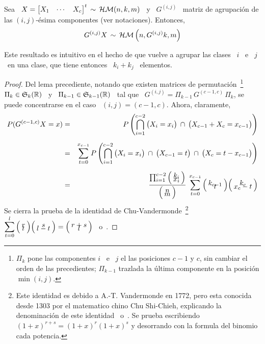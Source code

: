 %
\begin{lema}\label{Lem:MP:StabAgregacionHipergeomMulti}
%
  Sea  \ $X =  \begin{bmatrix} X_1  & \cdots  & X_c  \end{bmatrix}^t \,  \sim \,
  \mathcal{H}\mathcal{M}(n,k,m)$ \ y \ $G^{(i,j)}$ \ matriz de agrupaci\'on de las $(i,j)$-\'esima
  componentes (ver notaciones). Entonces,
  \[
  G^{(i,j)} X \, \sim \, \mathcal{H}\mathcal{M}\left( n , G^{(i,j)} k , m \right)  
  \]
\end{lema}
%
Este resultado es  intuitivo en el hecho  de que vuelve a agrupar  las clases \
$i$ \ e \ $j$ \ en una clase, que tiene entonces  \ $k_i + k_j$ \ elementos.
%

%
\begin{proof}
 Del  lema precediente,
  notando  que  existen  matrices  de permutaci\'on~\footnote{$\Pi_k$  pone  las
    componentes $i$ \ e \ $j$ el  las posiciones $c-1$ y $c$, sin cambiar el orden
    de  las  precedientes;  $\Pi_{k-1}$  trazlada  la  \'ultima  componente  en  la
    posici\'on $\min(i,j)$.}  \ $\Pi_k \in  \mathfrak{S}_k(\mathbb{R})$ \ y \ $\Pi_{k-1} \in
  \mathfrak{S}_{k-1}(\mathbb{R})$ \ tal que \ $G^{(i,j)} = \Pi_{k-1} \, G^{(c-1,c)} \, \Pi_k$,
  se puede concentrarse en el caso \ $(i,j) = (c-1,c)$. Ahora, claramente,
  \begin{eqnarray*}
  P(G^{(c-1,c)} X = x) & = & \displaystyle P\left( \bigcap_{i=1}^{c-2} \big( X_i = x_i \big)
  \: \cap \: \big( X_{c-1} + X_c = x_{c-1} \big) \right)\\[2mm]
  & = & \displaystyle \sum_{t=0}^{x_{c-1}} P\left( \bigcap_{i=1}^{c-2} \big( X_i = x_i \big)
  \: \cap \: \big( X_{c-1} = t\big) \: \cap \: \big( X_c = t-x_{c-1} \big) \right)\\[2mm]
  & = & \frac{\prod_{i=1}^{c-2} \bino{k_i}{x_i}}{\bino{n}{m}}
  \: \sum_{t=0}^{x_{c-1}} \bino{k_{c-1}}{t}\bino{k_c}{x_c-t}
  \end{eqnarray*}
  Se  cierra  la  prueba   de  la  identidad  de  Chu-Vandermonde~\footnote{Este
    identidad es  debido a A.-T. Vandermonde  en 1772, pero  esta conocida desde
    1303 por el matematico chino  Chu Shi-Chieh, explicando la denominaci\'on de
    este    identidad~\cite{AndLar94}   o~\cite[p.~59-60]{Ask75}.    Se   prueba
    escribiendo $(1+x)^{r+s} = (1+x)^r (1+x)^s$  y desorrando con la formula del
    binomio       cada      potencia.}        $\displaystyle      \sum_{t=0}^{l}
  \bino{r}{t}\bino{s}{l-t}   =  \bino{r+s}{l}$~\cite[Ec.~(21),  p.~59]{Kun97_v1}
  o~\cite[Ec.~0.156]{GraRyz15}.
\end{proof}

